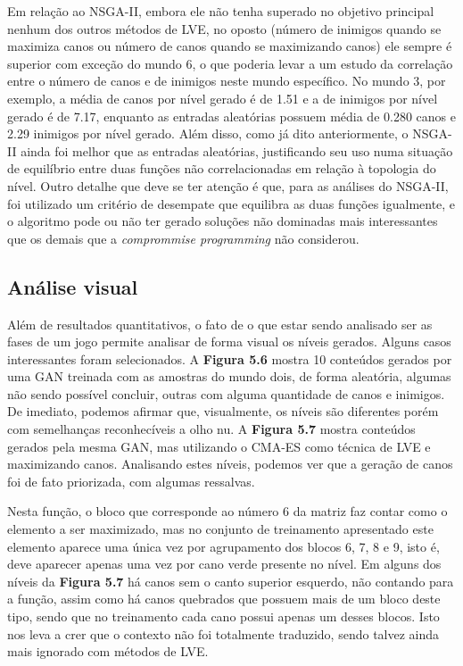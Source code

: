 Em relação ao NSGA-II, embora ele não tenha superado no objetivo principal nenhum dos outros métodos de LVE, no oposto (número de inimigos quando se maximiza canos ou número de canos quando se maximizando canos) ele sempre é superior com exceção do mundo 6, o que poderia levar a um estudo da correlação entre o número de canos e de inimigos neste mundo específico. No mundo 3, por exemplo, a média de canos por nível gerado é de 1.51 e a de inimigos por nível gerado é de 7.17, enquanto as entradas aleatórias possuem média de 0.280 canos e 2.29 inimigos por nível gerado. Além disso, como já dito anteriormente, o NSGA-II ainda foi melhor que as entradas aleatórias, justificando seu uso numa situação de equilíbrio entre duas funções não correlacionadas em relação à topologia do nível. Outro detalhe que deve se ter atenção é que, para as análises do NSGA-II, foi utilizado um critério de desempate que equilibra as duas funções igualmente, e o algoritmo pode ou não ter gerado soluções não dominadas mais interessantes que os demais que a \textit{comprommise programming} não considerou.

\subsection{Análise visual}

Além de resultados quantitativos, o fato de o que estar sendo analisado ser as fases de um jogo permite analisar de forma visual os níveis gerados. Alguns casos interessantes foram selecionados. A \textbf{Figura 5.6} mostra 10 conteúdos gerados por uma GAN treinada com as amostras do mundo dois, de forma aleatória, algumas não sendo possível concluir, outras com alguma quantidade de canos e inimigos. De imediato, podemos afirmar que, visualmente, os níveis são diferentes porém com semelhanças reconhecíveis a olho nu. A \textbf{Figura 5.7} mostra conteúdos gerados pela mesma GAN, mas utilizando o CMA-ES como técnica de LVE e maximizando canos. Analisando estes níveis, podemos ver que a geração de canos foi de fato priorizada, com algumas ressalvas. 

Nesta função, o bloco que corresponde ao número 6 da matriz faz contar como o elemento a ser maximizado, mas no conjunto de treinamento apresentado este elemento aparece uma única vez por agrupamento dos blocos 6, 7, 8 e 9, isto é, deve aparecer apenas uma vez por cano verde presente no nível. Em alguns dos níveis da \textbf{Figura 5.7} há canos sem o canto superior esquerdo, não contando para a função, assim como há canos quebrados que possuem mais de um bloco deste tipo, sendo que no treinamento cada cano possui apenas um desses blocos. Isto nos leva a crer que o contexto não foi totalmente traduzido, sendo talvez ainda mais ignorado com métodos de LVE.

